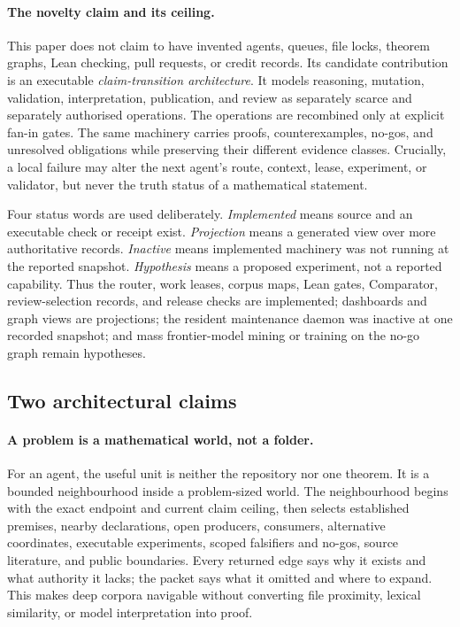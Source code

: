 \documentclass[10pt]{article}
\begin{document}
\paragraph{The novelty claim and its ceiling.}
This paper does not claim to have invented agents, queues, file locks, theorem
graphs, Lean checking, pull requests, or credit records. Its candidate
contribution is an executable \emph{claim-transition architecture}. It models
reasoning, mutation, validation, interpretation, publication, and review as
separately scarce and separately authorised operations. The operations are
recombined only at explicit fan-in gates. The same machinery carries proofs,
counterexamples, no-gos, and unresolved obligations while preserving their
different evidence classes. Crucially, a local failure may alter the next
agent's route, context, lease, experiment, or validator, but never the truth
status of a mathematical statement.

Four status words are used deliberately. \emph{Implemented} means source and
an executable check or receipt exist. \emph{Projection} means a generated view
over more authoritative records. \emph{Inactive} means implemented machinery
was not running at the reported snapshot. \emph{Hypothesis} means a proposed
experiment, not a reported capability. Thus the router, work leases, corpus
maps, Lean gates, Comparator, review-selection records, and release checks are
implemented; dashboards and graph views are projections; the resident
maintenance daemon was inactive at one recorded snapshot; and mass
frontier-model mining or training on the no-go graph remain hypotheses.

\subsection{Two architectural claims}

\paragraph{A problem is a mathematical world, not a folder.}
For an agent, the useful unit is neither the repository nor one theorem. It is
a bounded neighbourhood inside a problem-sized world. The neighbourhood begins
with the exact endpoint and current claim ceiling, then selects established
premises, nearby declarations, open producers, consumers, alternative
coordinates, executable experiments, scoped falsifiers and no-gos, source
literature, and public boundaries. Every returned edge says why it exists and
what authority it lacks; the packet says what it omitted and where to expand.
This makes deep corpora navigable without converting file proximity, lexical
similarity, or model interpretation into proof.
\end{document}
